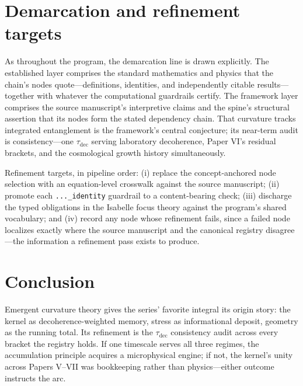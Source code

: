 \documentclass[11pt]{article}
\theoremstyle{remark}
\begin{document}
\section{Demarcation and refinement targets}
\label{sec:demarc}

As throughout the program, the demarcation line is drawn explicitly. The established layer comprises the standard mathematics and physics that the chain's nodes quote---definitions, identities, and independently citable results---together with whatever the computational guardrails certify. The framework layer comprises the source manuscript's interpretive claims and the spine's structural assertion that its nodes form the stated dependency chain. That curvature tracks integrated entanglement is the framework's central conjecture; its near-term audit is consistency---one $\tau_{\mathrm{dec}}$ serving laboratory decoherence, Paper VI's residual brackets, and the cosmological growth history simultaneously.

Refinement targets, in pipeline order: (i) replace the concept-anchored node selection with an equation-level crosswalk against the source manuscript; (ii) promote each \texttt{...\_identity} guardrail to a content-bearing check; (iii) discharge the typed obligations in the Isabelle focus theory against the program's shared vocabulary; and (iv) record any node whose refinement fails, since a failed node localizes exactly where the source manuscript and the canonical registry disagree---the information a refinement pass exists to produce.

\section{Conclusion}
\label{sec:conc}

Emergent curvature theory gives the series' favorite integral its origin story: the kernel as decoherence-weighted memory, stress as informational deposit, geometry as the running total. Its refinement is the $\tau_{\mathrm{dec}}$ consistency audit across every bracket the registry holds. If one timescale serves all three regimes, the accumulation principle acquires a microphysical engine; if not, the kernel's unity across Papers V--VII was bookkeeping rather than physics---either outcome instructs the arc.
\end{document}
